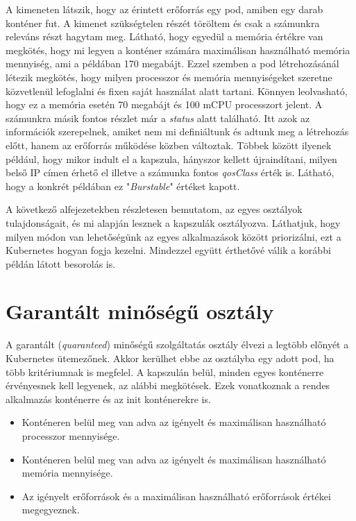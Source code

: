 A kimeneten látszik, hogy az érintett erőforrás egy pod, amiben egy darab konténer fut.
A kimenet szükségtelen részét töröltem és csak a számunkra releváns részt hagytam meg.
Látható, hogy egyedül a memória értékre van megkötés, hogy mi legyen a konténer számára maximálisan használható memória mennyiség, ami a példában 170 megabájt. 
Ezzel szemben a pod létrehozásánál létezik megkötés, hogy milyen processzor és memória mennyiségeket szeretne közvetlenül lefoglalni és fixen saját használat alatt tartani.
Könnyen leolvasható, hogy ez a memória esetén 70 megabájt és 100 mCPU processzort jelent.
A számunkra másik fontos részlet már a \textit{status} alatt található.
Itt azok az információk szerepelnek, amiket nem mi definiáltunk és adtunk meg a létrehozás előtt, hanem az erőforrás működése közben változtak.
Többek között ilyenek például, hogy mikor indult el a kapszula, hányszor kellett újraindítani, milyen belső IP címen érhető el illetve a számunka fontos \textit{qosClass} érték is.
Látható, hogy a konkrét példában ez "\textit{Burstable}" értéket kapott. \\

\lstset{caption=Adott kapszula minőségosztályának vizsgálata, label=get_qos_example}


A következő alfejezetekben részletesen bemutatom, az egyes osztályok tulajdonságait, és mi alapján lesznek a kapszulák osztályozva.
Láthatjuk, hogy milyen módon van lehetőségünk az egyes alkalmazások között priorizálni, ezt a Kubernetes hogyan fogja kezelni.
Mindezzel együtt érthetővé válik a korábbi példán látott besorolás is.


\section{Garantált minőségű osztály}

A garantált (\textit{quaranteed}) minőségű szolgáltatás osztály élvezi a legtöbb előnyét a Kubernetes ütemezőnek.
Akkor kerülhet ebbe az osztályba egy adott pod, ha több kritériumnak is megfelel.
A kapszulán belül, minden egyes konténerre érvényesnek kell legyenek, az alábbi megkötések. 
Ezek vonatkoznak a rendes alkalmazás konténerre és az init konténerekre is.

\begin{itemize}
    \item Konténeren belül meg van adva az igényelt és maximálisan használható processzor mennyisége.
    \item Konténeren belül meg van adva az igényelt és maximálisan használható memória mennyisége.
    \item Az igényelt erőforrások és a maximálisan használható erőforrások értékei megegyeznek.
\end{itemize}

